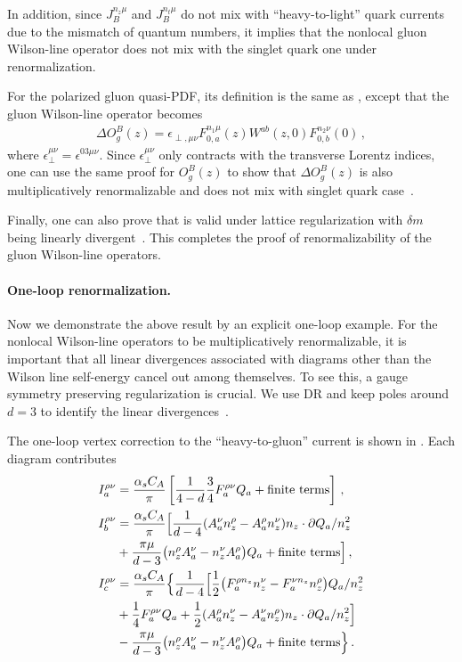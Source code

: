 In addition, since $J_{B}^{n_z\mu}$ and $J_{B}^{n_t\mu}$ do not mix with ``heavy-to-light'' quark currents due to the mismatch of quantum numbers, it implies that the nonlocal gluon Wilson-line operator does not mix with the singlet quark one under renormalization.

\vspace{.3cm}
For the polarized gluon quasi-PDF, its definition is the same as , except that the gluon Wilson-line operator becomes
\begin{align}
	\Delta O^B_g(z) = \epsilon_{\perp,\mu\nu} F^{n_1\mu}_{0,a}(z) W^{ab}(z,0) F^{n_2\nu}_{0,b}(0)\,,
\end{align}
where $\epsilon_{\perp}^{\mu\nu}=\epsilon^{03\mu\nu}$. Since $\epsilon_{\perp}^{\mu\nu}$ only contracts with the transverse Lorentz indices, one can use the same proof for $O^B_g(z)$ to show that $\Delta O^B_g(z)$ is also multiplicatively renormalizable and does not mix with singlet quark case~\cite{Zhang:2018diq}.

Finally, one can also prove that  is valid under lattice regularization with $\delta m$ being linearly divergent~\cite{Zhang:2018diq}. This completes the proof of renormalizability of the gluon Wilson-line operators.

\paragraph*{One-loop renormalization.}
Now we demonstrate the above result by an explicit one-loop example. For the nonlocal Wilson-line operators to be multiplicatively renormalizable, it is important that all linear divergences associated with diagrams other than the Wilson line self-energy cancel out among themselves. To see this, a gauge symmetry preserving regularization is crucial. We use DR and keep poles around $d=3$ to identify the linear divergences~\cite{Zhang:2018diq,Wang:2019tgg}.

The one-loop vertex correction to the ``heavy-to-gluon'' current is shown in . Each diagram contributes
\begin{align}\label{eq:pole_auxiliary}
	I_a^{\rho\nu}&= \frac{\alpha_s C_A}{\pi}\left[{1\over 4-d}{3\over 4} F_a^{\rho\nu}Q_a + {\rm finite\ terms}\right]\,,\nonumber\\
	I_b^{\rho\nu}&= \frac{\alpha_s C_A}{\pi}\Big[\frac{1}{d-4}(A_a^\nu n_z^\rho-A_a^\rho n_z^\nu) n_z\cdot \partial Q_a/n_z^2 \nonumber\\
	&+\frac{\pi\mu}{d-3}\big(n_z^\rho A_a^\nu-n_z^\nu A_a^\rho\big)Q_a+{\rm finite\ terms}\Big]\,,\nonumber\\
	I_c^{\rho\nu}&=\frac{\alpha_s C_A}{\pi}\Big\{\frac{1}{d-4}\Big[\frac{1}{2}\big(F_a^{\rho n_z}n_z^\nu -F_a^{\nu n_z}n_z^\rho \big) Q_a/n_z^2 \nonumber\\
	&+\frac{1}{4}F_a^{\rho\nu}Q_a+\frac 1 2 (A_a^\rho n_z^\nu-A_a^\nu n_z^\rho) n_z\cdot \partial Q_a/n_z^2\Big]\nonumber\\
	&-\frac{\pi\mu}{d-3}\big(n_z^\rho A_a^\nu-n_z^\nu A_a^\rho\big) Q_a+{\rm finite\ terms}\Big\}\,.
\end{align}


